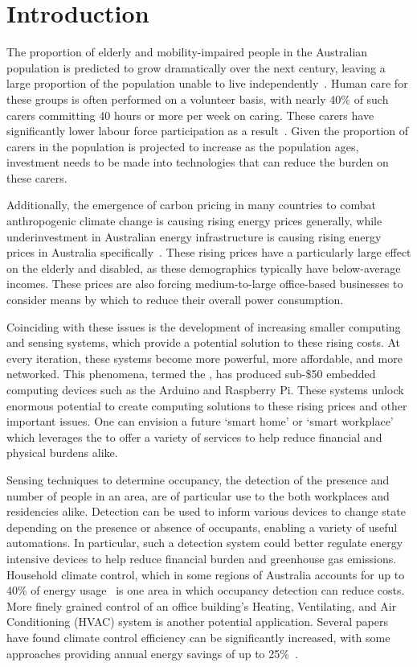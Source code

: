 \documentclass[../thesis/thesis.tex]{subfiles}
\begin{document}
\chapter{Introduction}
The proportion of elderly and mobility-impaired people in the Australian population is predicted to grow dramatically over the next century, leaving a large proportion of the population unable to live independently~\cite{chan2009smart}. Human care for these groups is often performed on a volunteer basis, with nearly 40\% of such carers committing 40 hours or more per week on caring. These carers have significantly lower labour force participation as a result~\cite{abs4430}. Given the proportion of carers in the population is projected to increase as the population ages, investment needs to be made into technologies that can reduce the burden on these carers.

Additionally, the emergence of carbon pricing in many countries to combat anthropogenic climate change is causing rising energy prices generally, while underinvestment in Australian energy infrastructure is causing rising energy prices in Australia specifically~\cite{energyprices}. These rising prices have a particularly large effect on the elderly and disabled, as these demographics typically have below-average incomes. These prices are also forcing medium-to-large office-based businesses to consider means by which to reduce their overall power consumption.

Coinciding with these issues is the development of increasing smaller computing and sensing systems, which provide a potential solution to these rising costs. At every iteration, these systems become more powerful, more affordable, and more networked. This phenomena, termed the \iot, has produced sub-\$50 embedded computing devices such as the Arduino and Raspberry Pi. These systems unlock enormous potential to create computing solutions to these rising prices and other important issues. One can envision a future `smart home' or `smart workplace' which leverages the \iot to offer a variety of services to help reduce financial and physical burdens alike.

Sensing techniques to determine occupancy, the detection of the presence and number of people in an area, are of particular use to the both workplaces and residencies alike. Detection can be used to inform various devices to change state depending on the presence or absence of occupants, enabling a variety of useful automations. In particular, such a detection system could better regulate energy intensive devices to help reduce financial burden and greenhouse gas emissions. Household climate control, which in some regions of Australia accounts for up to 40\% of energy usage~\cite{abs4602} is one area in which occupancy detection can reduce costs. More finely grained control of an office building's Heating, Ventilating, and Air Conditioning (HVAC) system is another potential application. Several papers have found climate control efficiency can be significantly increased, with some approaches providing annual energy savings of up to 25\%~\cite{beltran2013thermosense}.
 
\end{document}
